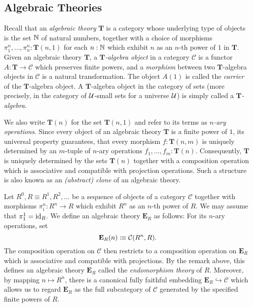 {
\newcommand{\cat}[1]{\mathcal{#1}}
\newcommand{\theory}[1]{\mathbf{#1}}
\newcommand{\Psh}{\mathop{PSh}}
\newcommand{\Set}{\mathsf{Set}}
\newcommand{\TT}{\theory{T}}
\newcommand{\EE}{\theory{E}}
\newcommand{\Com}{\theory{Com}}
\newcommand{\diffquot}[2]{\frac{\Delta{#1}}{\Delta{#2}}}

\subsection{Algebraic Theories}

Recall that an \emph{algebraic theory} \(\TT\) is a category whose underlying type of objects is the set \(\mathbb{N}\) of natural numbers, together with a choice of morphisms \(\pi^n_1,\dots,\pi^n_n : \TT(n,1)\) for each \(n : \mathbb{N}\) which exhibit \(n\) as an \(n\)-th power of \(1\) in \(\TT\).
Given an algebraic theory \(\TT\), a \emph{\(\TT\)-algebra object} in a category \(\cat C\) is a functor \(A:\TT\to\cat C\) which preserves finite powers, and a \emph{morphism} between two \(\TT\)-algebra objects in \(\cat C\) is a natural transformation.
The object \(A(1)\) is called the \emph{carrier} of the \(\TT\)-algebra object.
A \(\TT\)-algebra object in the category of sets (more precisely, in the category of \(\mathcal{U}\)-small sets for a universe \(\mathcal{U}\)) is simply called a \emph{\(\TT\)-algebra}.

\begin{remark}
  We also write \(\TT(n)\) for the set \(\TT(n,1)\) and refer to its terms as \emph{\(n\)-ary operations}.
  Since every object of an algebraic theory \(\TT\) is a finite power of \(1\), its universal property guarantees, that every morphism \(f:\TT(n,m)\) is uniquely determined by an \(m\)-tuple of \(n\)-ary operations \(f_1,\dots,f_m : \TT(n)\).
  Consequently, \(\TT\) is uniquely determined by the sets \(\TT(n)\) together with a composition operation which is associative and compatible with projection operations.
  Such a structure is also known as an \emph{(abstract) clone} of an algebraic theory.
\end{remark}

\begin{example}
Let \(R^0,R\equiv R^1,R^2,\dots\) be a sequence of objects of a category \(\cat C\) together with morphisms \(\pi^n_i : R^n \to R\) which exhibit \(R^n\) as an \(n\)-th power of \(R\).
We may assume that \(\pi^1_1 = \mathrm{id}_R\).
We define an algebraic theory \(\EE_R\) as follows: For its \(n\)-ary operations, set
\[\EE_R(n) \colonequiv \cat C(R^n,R).\]
The composition operation on \(\cat C\) then restricts to a composition operation on \(\EE_R\) which is associative and compatible with projections.
By the remark above, this defines an algebraic theory \(\EE_R\) called the \emph{endomorphism theory} of \(R\).
Moreover, by mapping \(n\mapsto R^n\), there is a canonical fully faithful embedding \(\EE_R \hookrightarrow \cat C\) which allows us to regard \(\EE_R\) as the full subcategory of \(\cat C\) generated by the specified finite powers of \(R\).
\end{example}

}
